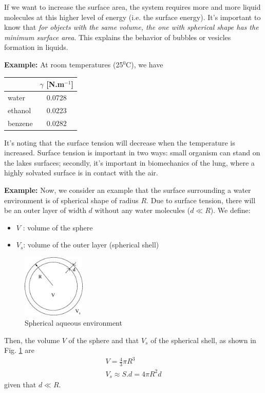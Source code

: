 \begin{framed}
  If we want to increase the surface area, the system requires more
  and more liquid molecules at this higher level of energy (i.e. the
  surface energy).  It's important to know that
  {\it for objects with the same volume, the one with spherical shape
    has the minimum surface area}.
  This explains the behavior of bubbles or vesicles formation in
  liquids.
\end{framed}


{\bf Example:} At room temperatures (25$^0$C), we have
\begin{center}
  \begin{tabular}{|l|c|}
    \hline
    & $\gamma$ [N.m$^{-1}$] \\
    \hline\hline
    water & 0.0728 \\
    ethanol & 0.0223 \\
    benzene & 0.0282 \\
    \hline
  \end{tabular}
\end{center}
It's noting that the surface tension will decrease when the
temperature is increased.  Surface tension is important in two ways:
small organism can stand on the lakes surfaces; secondly, it's
important in biomechanics of the lung, where a highly solvated surface
is in contact with the air.

{\bf Example:} Now, we consider an example that the surface
surrounding a water environment is of spherical shape of radius
$R$. Due to surface tension, there will be an outer layer of width $d$
without any water molecules ($d\ll R$). We define:
\begin{itemize}
\item $V$ : volume of the sphere
\item $V_s$: volume of the outer layer (spherical shell)
\end{itemize}
\begin{figure}[htb]
  \centerline{\includegraphics[height=3cm]{./images/sphere_water.eps}}
  \caption{Spherical aqueous environment}\label{fig:sphere_water}
\end{figure}
Then, the volume $V$ of the sphere and that $V_s$ of the spherical
shell, as shown in Fig. \ref{fig:sphere_water} are
\begin{equation}\begin{split}
    V = \frac{4}{3} \pi R^3 \\
    V_s \approx S.d = 4\pi R^2 d
  \end{split}
\end{equation}
given that $d \ll R$.


